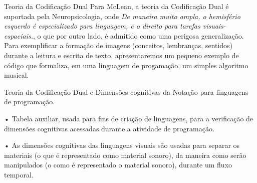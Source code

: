 \documentclass[aspectratio=169]{beamer}
\begin{document}
\begin{frame}{Teoria da Codificação Dual}
Para McLean, a teoria da Codificação Dual é suportada pela Neuropsicologia, onde \emph{De maneira muito ampla, o hemisfério esquerdo é especializado para linguagem, e o direito para tarefas visuais-espaciais.}, o que por outro lado, é admitido como uma perigosa generalização. Para exemplificar a formação de imagens (conceitos, lembranças, sentidos) durante a leitura e escrita de texto, apresentaremos um pequeno exemplo de código que formaliza, em uma linguagem de progamação, um simples algoritmo musical.
\end{frame}

\begin{frame}{Teoria da Codificação Dual e Dimensões cognitivas da Notação para linguagens de programação.}

• Tabela auxiliar, usada para fins de criação de linguagens, para a verificação de dimensões cognitivas acessadas durante a atividade de programação.

• As dimensões cognitivas das linguagens visuais são usadas para separar os materiais (o que é representado como material sonoro), da maneira como serão manipulados (o como é representado o material sonoro), durante um fluxo temporal.
\end{frame}
\end{document}
